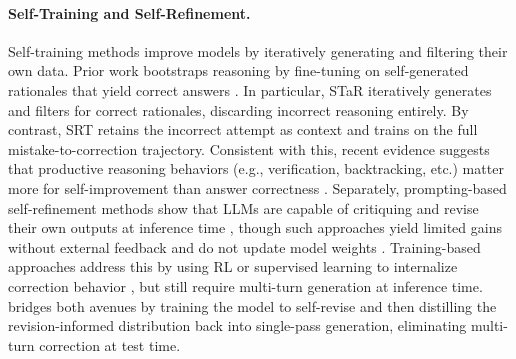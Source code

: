 \paragraph{Self-Training and Self-Refinement.}
Self-training methods improve models by iteratively generating and filtering their own data. 
Prior work bootstraps reasoning by fine-tuning on self-generated rationales that yield correct answers \citep{zelikman2022star, yuan2023scalingrelationshiplearningmathematical, singh2023rest, yuan2024selfrewarding}.
In particular, STaR \citep{zelikman2022star} iteratively generates and filters for correct rationales, discarding incorrect reasoning entirely.
By contrast, SRT retains the incorrect attempt as context and trains on the full mistake-to-correction trajectory.
Consistent with this,
recent evidence suggests that productive reasoning behaviors (e.g., verification, backtracking, etc.) matter more for self-improvement than answer correctness \citep{gandhi2025cognitive}.
Separately, prompting-based self-refinement methods show that LLMs are capable of critiquing and revise their own outputs at inference time \citep{madaan2023selfrefine, shinn2023reflexion}, though such approaches yield limited gains without external feedback and do not update model weights \citep{huang2023selfcorrect, kamoi2024selfcorrection}.
Training-based approaches address this by using RL or supervised learning to internalize correction behavior \citep{kumar2024score, havrilla2024glore}, but still require multi-turn generation at inference time.
\ours{} bridges both avenues by training the model to self-revise and then distilling the revision-informed distribution back into single-pass generation, eliminating multi-turn correction at test time.

